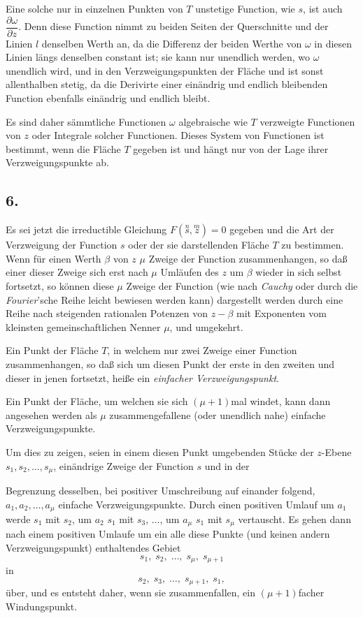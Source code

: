 \documentclass{article}
\begin{document}
Eine solche nur in einzelnen Punkten von $T$ unstetige Function, wie $s$, ist auch $\dfrac{\partial\omega}{\partial z}$. Denn diese Function nimmt zu beiden Seiten der Querschnitte und der Linien $l$ denselben Werth an, da die Differenz der beiden Werthe von $\omega$ in diesen Linien längs denselben constant ist; sie kann nur unendlich werden, wo $\omega$ unendlich wird, und in den Verzweigungspunkten der Fläche und ist sonst allenthalben stetig, da die Derivirte einer einändrig und endlich bleibenden Function ebenfalls einändrig und endlich bleibt.

Es sind daher sämmtliche Functionen $\omega$ algebraische wie $T$ verzweigte Functionen von $z$ oder Integrale solcher Functionen. Dieses System von Functionen ist bestimmt, wenn die Fläche $T$ gegeben ist und hängt nur von der Lage ihrer Verzweigungspunkte ab.

\subsection*{6.}

Es sei jetzt die irreductible Gleichung $F(\overset{n}{s}, \overset{m}{z}) = 0$ gegeben und die Art der Verzweigung der Function $s$ oder der sie darstellenden Fläche $T$ zu bestimmen. Wenn für einen Werth $\beta$ von $z$ $\mu$ Zweige der Function zusammenhangen, so daß einer dieser Zweige sich erst nach $\mu$ Umläufen des $z$ um $\beta$ wieder in sich selbst fortsetzt, so können diese $\mu$ Zweige der Function (wie nach \emph{Cauchy} oder durch die \emph{Fourier}'sche Reihe leicht bewiesen werden kann) dargestellt werden durch eine Reihe nach steigenden rationalen Potenzen von $z-\beta$ mit Exponenten vom kleinsten gemeinschaftlichen Nenner $\mu$, und umgekehrt.

Ein Punkt der Fläche $T$, in welchem nur zwei Zweige einer Function zusammenhangen, so daß sich um diesen Punkt der erste in den zweiten und dieser in jenen fortsetzt, heiße ein \emph{einfacher Verzweigungspunkt}.

Ein Punkt der Fläche, um welchen sie sich $(\mu+1)$mal windet, kann dann angesehen werden als $\mu$ zusammengefallene (oder unendlich nahe) einfache Verzweigungspunkte.

Um dies zu zeigen, seien in einem diesen Punkt umgebenden Stücke der $z$-Ebene $s_{1}, s_{2}, \ldots, s_{\mu}$, einändrige Zweige der Function $s$ und in der

Begrenzung desselben, bei positiver Umschreibung auf einander folgend, $a_{1}, a_{2}, \ldots, a_{\mu}$ einfache Verzweigungspunkte. Durch einen positiven Umlauf um $a_{1}$ werde $s_{1}$ mit $s_{2}$, um $a_{2}$ $s_{1}$ mit $s_{3}$, $\ldots$, um $a_{\mu}$ $s_{1}$ mit $s_{\mu}$ vertauscht. Es gehen dann nach einem positiven Umlaufe um ein alle diese Punkte (und keinen andern Verzweigungspunkt) enthaltendes Gebiet
\[ s_{1}, \; s_{2}, \; \ldots, \; s_{\mu}, \; s_{\mu+1} \]
in
\[ s_{2}, \; s_{3}, \; \ldots, \; s_{\mu+1}, \; s_{1}, \]
über, und es entsteht daher, wenn sie zusammenfallen, ein $(\mu+1)$facher Windungspunkt.
\end{document}
